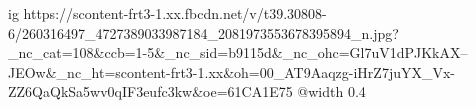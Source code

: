  
 
 
 
 

\ifcmt
  ig https://scontent-frt3-1.xx.fbcdn.net/v/t39.30808-6/260316497_4727389033987184_2081973553678395894_n.jpg?_nc_cat=108&ccb=1-5&_nc_sid=b9115d&_nc_ohc=Gl7uV1dPJKkAX--JEOw&_nc_ht=scontent-frt3-1.xx&oh=00_AT9Aaqzg-iHrZ7juYX_Vx-ZZ6QaQkSa5wv0qIF3eufc3kw&oe=61CA1E75
  @width 0.4
\fi
